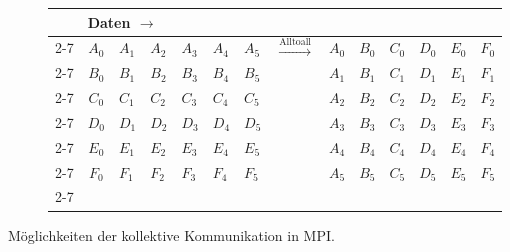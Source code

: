 \begin{figure}[b]
      \begin{subfigure}[l]{0.87\textwidth}
	\begin{tabular}[]{m{0.2cm} m{0.3cm}|m{0.3cm}|m{0.3cm}|m{0.3cm}|m{0.3cm}|m{0.3cm} m{1.5cm} m{0.3cm}|m{0.3cm}|m{0.3cm}|m{0.3cm}|m{0.3cm}|m{0.3cm}}
	  & \multicolumn{13}{l}{Daten $\longrightarrow$}\\
	  \cline{2-7} \cline{9-14}
	  \multirow{6}{*}{\begin{turn}{-90} Prozesse $\longrightarrow$ \end{turn}}
	  &\multicolumn{1}{|c|}{$A_0$}&$A_1$&$A_2$&$A_3$&$A_4$&\multicolumn{1}{|m{0.3cm}|}{$A_5$} &\multirow{6}{*}{\large $\xrightarrow{\text{Alltoall}}$} & \multicolumn{1}{|c|}{$A_0$}&$B_0$&$C_0$&$D_0$&$E_0$&\multicolumn{1}{|m{0.3cm}|}{$F_0$}\\
	  \cline{2-7} \cline{9-14}
	  &\multicolumn{1}{|c|}{$B_0$}&$B_1$&$B_2$&$B_3$&$B_4$&\multicolumn{1}{|m{0.3cm}|}{$B_5$} & & \multicolumn{1}{|c|}{$A_1$}&$B_1$&$C_1$&$D_1$&$E_1$&\multicolumn{1}{|m{0.3cm}|}{$F_1$}\\
	  \cline{2-7} \cline{9-14}
	  &\multicolumn{1}{|c|}{$C_0$}&$C_1$&$C_2$&$C_3$&$C_4$&\multicolumn{1}{|m{0.3cm}|}{$C_5$} & & \multicolumn{1}{|c|}{$A_2$}&$B_2$&$C_2$&$D_2$&$E_2$&\multicolumn{1}{|m{0.3cm}|}{$F_2$}\\
	  \cline{2-7} \cline{9-14}
	  &\multicolumn{1}{|c|}{$D_0$}&$D_1$&$D_2$&$D_3$&$D_4$&\multicolumn{1}{|m{0.3cm}|}{$D_5$} & & \multicolumn{1}{|c|}{$A_3$}&$B_3$&$C_3$&$D_3$&$E_3$&\multicolumn{1}{|m{0.3cm}|}{$F_3$}\\
	  \cline{2-7} \cline{9-14}
	  &\multicolumn{1}{|c|}{$E_0$}&$E_1$&$E_2$&$E_3$&$E_4$&\multicolumn{1}{|m{0.3cm}|}{$E_5$} & & \multicolumn{1}{|c|}{$A_4$}&$B_4$&$C_4$&$D_4$&$E_4$&\multicolumn{1}{|m{0.3cm}|}{$F_4$}\\
	  \cline{2-7} \cline{9-14}
	  &\multicolumn{1}{|c|}{$F_0$}&$F_1$&$F_2$&$F_3$&$F_4$&\multicolumn{1}{|m{0.3cm}|}{$F_5$} & & \multicolumn{1}{|c|}{$A_5$}&$B_5$&$C_5$&$D_5$&$E_5$&\multicolumn{1}{|m{0.3cm}|}{$F_5$}\\
	  \cline{2-7} \cline{9-14}
	\end{tabular}
      \end{subfigure}
      
      \caption{Möglichkeiten der kollektive Kommunikation in MPI. \citep{dartmouth}}%
\end{figure}%